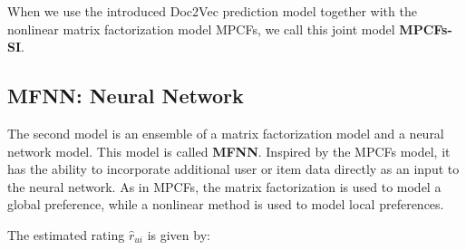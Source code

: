 %

When we use the introduced Doc2Vec prediction model together with the nonlinear matrix factorization model MPCFs, we call this joint model \textbf{MPCFs-SI}.

\newpage
\subsection{MFNN: Neural Network}
\label{sst:mfnn}

The second model is an ensemble of a matrix factorization model and a neural network model.
This model is called \textbf{MFNN}.
Inspired by the MPCFs model, it has the ability to incorporate additional user or item data directly as an input to the neural network.
As in MPCFs, the matrix factorization is used to model a global preference, while a nonlinear method is used to model local preferences.

The estimated rating \textit{$\hat{r}_{ui}$} is given by:

